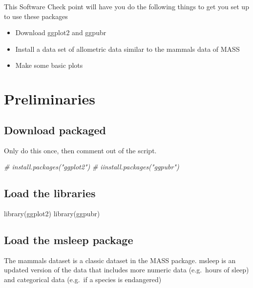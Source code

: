 \documentclass[
]{book}
\newenvironment{Shaded}{\begin{snugshade}}{\end{snugshade}}
\newcommand{\CommentTok}[1]{\textcolor[rgb]{0.56,0.35,0.01}{\textit{#1}}}
\newcommand{\FunctionTok}[1]{\textcolor[rgb]{0.00,0.00,0.00}{#1}}
\newcommand{\NormalTok}[1]{#1}
\providecommand{\tightlist}{%
  \setlength{\itemsep}{0pt}\setlength{\parskip}{0pt}}
\begin{document}
This Software Check point will have you do the following things to get you set up to use these packages

\begin{itemize}
\tightlist
\item
  Download ggplot2 and ggpubr
\item
  Install a data set of allometric data similar to the mammals data of MASS
\item
  Make some basic plots
\end{itemize}

\hypertarget{preliminaries-4}{%
\section{Preliminaries}\label{preliminaries-4}}

\hypertarget{download-packaged}{%
\subsection{Download packaged}\label{download-packaged}}

Only do this once, then comment out of the script.

\begin{Shaded}
\begin{Highlighting}[]
\CommentTok{\# install.packages("ggplot2")}
\CommentTok{\# iinstall.packages("ggpubr")}
\end{Highlighting}
\end{Shaded}

\hypertarget{load-the-libraries}{%
\subsection{Load the libraries}\label{load-the-libraries}}

\begin{Shaded}
\begin{Highlighting}[]
\FunctionTok{library}\NormalTok{(ggplot2)}
\FunctionTok{library}\NormalTok{(ggpubr)}
\end{Highlighting}
\end{Shaded}

\hypertarget{load-the-msleep-package}{%
\subsection{Load the msleep package}\label{load-the-msleep-package}}

The mammals dataset is a classic dataset in the MASS package. msleep is an updated version of the data that includes more numeric data (e.g.~hours of sleep) and categorical data (e.g.~if a species is endangered)
\end{document}
